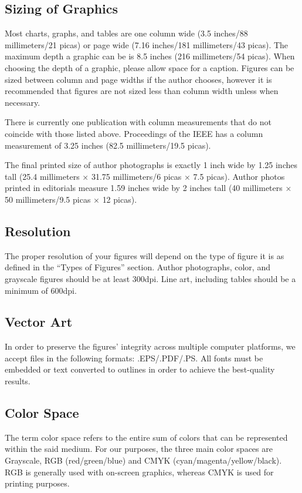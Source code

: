 \documentclass[journal,twoside,web]{ieeecolor}
\begin{document}
\subsection{Sizing of Graphics}
Most charts, graphs, and tables are one column wide (3.5 inches/88 
millimeters/21 picas) or page wide (7.16 inches/181 millimeters/43 
picas). The maximum depth a graphic can be is 8.5 inches (216 millimeters/54
picas). When choosing the depth of a graphic, please allow space for a 
caption. Figures can be sized between column and page widths if the author 
chooses, however it is recommended that figures are not sized less than 
column width unless when necessary. 

There is currently one publication with column measurements that do not 
coincide with those listed above. Proceedings of the IEEE has a column 
measurement of 3.25 inches (82.5 millimeters/19.5 picas). 

The final printed size of author photographs is exactly
1 inch wide by 1.25 inches tall (25.4 millimeters$\,\times\,$31.75 millimeters/6 
picas$\,\times\,$7.5 picas). Author photos printed in editorials measure 1.59 inches 
wide by 2 inches tall (40 millimeters$\,\times\,$50 millimeters/9.5 picas$\,\times\,$12 
picas).

\subsection{Resolution }
The proper resolution of your figures will depend on the type of figure it 
is as defined in the ``Types of Figures'' section. Author photographs, 
color, and grayscale figures should be at least 300dpi. Line art, including 
tables should be a minimum of 600dpi.

\subsection{Vector Art}
In order to preserve the figures' integrity across multiple computer 
platforms, we accept files in the following formats: .EPS/.PDF/.PS. All 
fonts must be embedded or text converted to outlines in order to achieve the 
best-quality results.

\subsection{Color Space}
The term color space refers to the entire sum of colors that can be 
represented within the said medium. For our purposes, the three main color 
spaces are Grayscale, RGB (red/green/blue) and CMYK 
(cyan/magenta/yellow/black). RGB is generally used with on-screen graphics, 
whereas CMYK is used for printing purposes.
\end{document}
